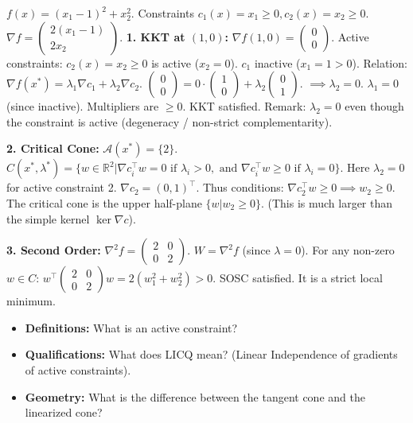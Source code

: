 \begin{correction}
$f(x) = (x_1-1)^2 + x_2^2$. Constraints $c_1(x) = x_1 \ge 0, c_2(x) = x_2 \ge 0$.
$\nabla f = \begin{pmatrix} 2(x_1-1) \\ 2x_2 \end{pmatrix}$.
\textbf{1. KKT at $(1,0)$:}
$\nabla f(1,0) = \begin{pmatrix} 0 \\ 0 \end{pmatrix}$.
Active constraints: $c_2(x) = x_2 \ge 0$ is active ($x_2=0$). $c_1$ inactive ($x_1=1 > 0$).
Relation: $\nabla f(x^*) = \lambda_1 \nabla c_1 + \lambda_2 \nabla c_2$.
$\begin{pmatrix} 0 \\ 0 \end{pmatrix} = 0 \cdot \begin{pmatrix} 1 \\ 0 \end{pmatrix} + \lambda_2 \begin{pmatrix} 0 \\ 1 \end{pmatrix}$.
$\implies \lambda_2 = 0$. $\lambda_1=0$ (since inactive).
Multipliers are $\ge 0$. KKT satisfied.
Remark: $\lambda_2 = 0$ even though the constraint is active (degeneracy / non-strict complementarity).

\textbf{2. Critical Cone:}
$\mathcal{A}(x^*) = \{2\}$.
$C(x^*, \lambda^*) = \{ w \in \mathbb{R}^2 | \nabla c_i^\top w = 0 \text{ if } \lambda_i > 0, \text{ and } \nabla c_i^\top w \ge 0 \text{ if } \lambda_i = 0 \}$.
Here $\lambda_2 = 0$ for active constraint 2.
$\nabla c_2 = (0, 1)^\top$.
Thus conditions: $\nabla c_2^\top w \ge 0 \implies w_2 \ge 0$.
The critical cone is the upper half-plane $\{ w | w_2 \ge 0 \}$.
(This is much larger than the simple kernel $\ker \nabla c$).

\textbf{3. Second Order:}
$\nabla^2 f = \begin{pmatrix} 2 & 0 \\ 0 & 2 \end{pmatrix}$. $W = \nabla^2 f$ (since $\lambda=0$).
For any non-zero $w \in C$: $w^\top \begin{pmatrix} 2 & 0 \\ 0 & 2 \end{pmatrix} w = 2(w_1^2 + w_2^2) > 0$.
SOSC satisfied. It is a strict local minimum.
\end{correction}
\bigskip

\bigskip
\begin{checkpoint}
\begin{itemize}
    \item \textbf{Definitions:} What is an active constraint?
    \item \textbf{Qualifications:} What does LICQ mean? (Linear Independence of gradients of active constraints).
    \item \textbf{Geometry:} What is the difference between the tangent cone and the linearized cone?
\end{itemize}
\end{checkpoint}
